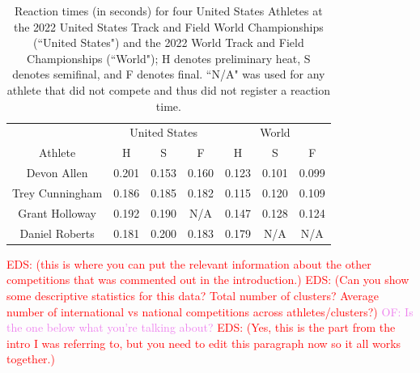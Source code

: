 \documentclass[12pt, letterpaper, titlepage]{article}
\newcommand{\eds}[1]{\textcolor{red}{EDS: (#1)}}
\newcommand{\of}[1]{\textcolor{violet}{OF: #1}}
\begin{document}
\begin{table}
\begin{center}
  \caption{Reaction times (in seconds) for four United States Athletes at the 
	2022 United States Track
  and Field World Championships (``United States") and the 2022 World Track and Field 
	Championships (``World"); H denotes preliminary heat, S denotes semifinal, and 
	F denotes final.
  ``N/A" was used for any athlete that did not compete and thus did not register 
  a reaction time. }
  \begin{tabular}{c c c c c c c} 
   \toprule
	 & \multicolumn{3}{c}{United States} & \multicolumn{3}{c}{World} \\
	\cmidrule(lr){2-4}
    \cmidrule(lr){5-7}
   Athlete &  H &  S &  F &  H &  S &  F \\ [0.5ex] 
   \midrule
   Devon Allen & 0.201 & 0.153 & 0.160 & 0.123 & 0.101 & 0.099 \\ 
   Trey Cunningham & 0.186 & 0.185 & 0.182 & 0.115 & 0.120 & 0.109 \\
   Grant Holloway & 0.192 & 0.190 & N/A & 0.147 & 0.128 & 0.124 \\
   Daniel Roberts & 0.181 & 0.200 & 0.183 & 0.179 & N/A & N/A \\ [0.5ex]
   \bottomrule
  \end{tabular}
  \label{fig:USAvsWorld}
  
  \end{center}
\end{table}


\eds{this is where you can put the relevant 
information about the other competitions that was commented out in the 
introduction.}
\eds{Can you show some descriptive statistics for this data?  Total number of 
clusters? Average number of international vs national competitions across 
athletes/clusters?}
\of{Is the one below what you're talking about?}
\eds{Yes, this is the part from the intro I was referring to, but you need to 
edit this paragraph now so it all works together.}
\end{document}
